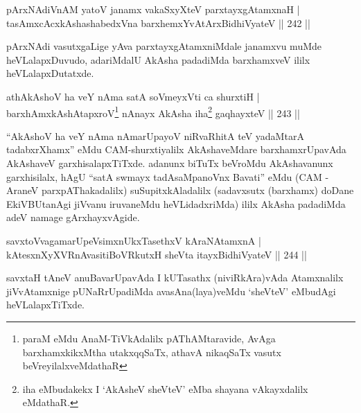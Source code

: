 \begin{shl}
pArxNAdiVnAM yatoV janamx vakaSxyXteV parxtayxgAtamxnaH |\\
tasAmxcAcx\s \s kAshashabedxVna barxhemxYvAtArxBidhiVyateV \hfill || 242 ||
\end{shl}

\begin{artha}
pArxNAdi vasutxgaLige yAva parxtayxgAtamxniMdale janamxvu muMde heVLalapxDuvudo, adariMdalU AkAsha padadiMda barxhamxveV ililx heVLalapxDutatxde.
\end{artha}


\begin{shl}
athA\s \s kAshoV ha veY nAma satA soVmeyxVti ca shurxtiH |\\
barxhAmxkAshAtapxroV\footnote{paraM eMdu AnaM-TiVkAdalilx pAThAMtaravide, AvAga  barxhamxkikxMtha utakxqqSaTx, athavA nikaqSaTx vasutx  beVreyilalxveMdathaR} nAnayx AkAsha iha\footnote{iha eMbudakekx I `AkAsheV sheVteV' eMba  shayana vAkayxdalilx eMdathaR.} gaqhayxteV \hfill || 243 ||
\end{shl}

\begin{artha}
``AkAshoV ha veY nAma nAmarUpayoV niRvaRhitA teV yadaMtarA tadabxrXhamx'' eMdu CAM-shurxtiyalilx  AkAshaveMdare barxhamxrUpavAda AkAshaveV garxhisalapxTiTxde. adanunx biTuTx beVroMdu AkAshavanunx garxhisilalx, hAgU ``satA swmayx tadAsaMpanoVnx Bavati'' eMdu (CAM - AraneV parxpAThakadalilx) suSupitxkAladalilx (sadavxsutx (barxhamx) doDane EkiVBUtanAgi jiVvanu iruvaneMdu heVLidadxriMda) ililx AkAsha padadiMda adeV namage gArxhayxvAgide.
\end{artha}


\begin{shl}
savxtoVvagamarUpeV\s simxnUkxTasethxV kAraNAtamxnA |\\
kAtesxnXyXVRnAvasitiBoVRkutxH sheVta itayxBidhiVyateV \hfill || 244 ||
\end{shl}

\begin{artha}
savxtaH tAneV anuBavarUpavAda I kUTasathx (niviRkAra)vAda Atamxnalilx jiVvAtamxnige pUNaRrUpadiMda avasAna(laya)veMdu `sheVteV' eMbudAgi heVLalapxTiTxde.
\end{artha}

